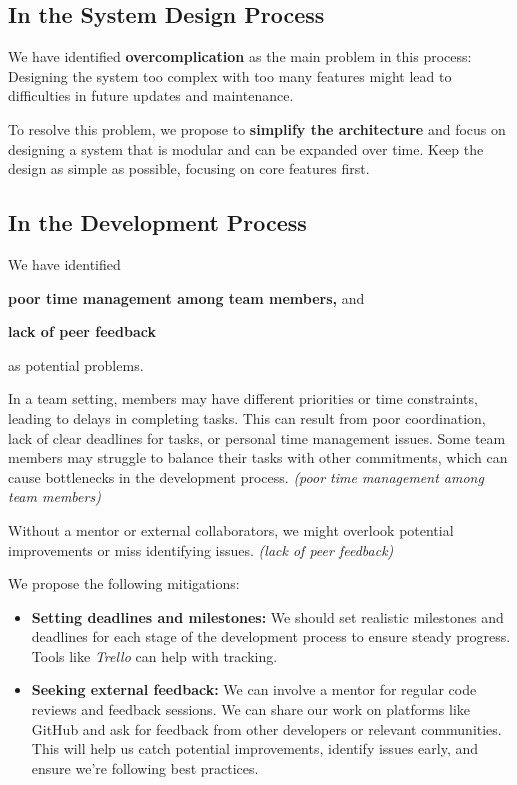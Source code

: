 \documentclass[a4paper,journal]{IEEEtran}
\begin{document}
\subsection{In the System Design Process}
We have identified \textbf{overcomplication} as the main problem in this
process:
Designing the system too complex with too many features might lead to
difficulties in future updates and maintenance.

To resolve this problem, we propose to \textbf{simplify the architecture} and
focus on designing a system that is modular and can be expanded over time.
Keep the design as simple as possible, focusing on core features first.

\subsection{In the Development Process}
We have identified
\begin{enumerate*}
  \item \textbf{poor time management among team members,} and
  \item \textbf{lack of peer feedback}
\end{enumerate*}
as potential problems.

In a team setting, members may have different priorities or time constraints,
leading to delays in completing tasks.
This can result from poor coordination, lack of clear deadlines for tasks, or
personal time management issues.
Some team members may struggle to balance their tasks with other commitments,
which can cause bottlenecks in the development process.
\textit{(poor time management among team members)}

Without a mentor or external collaborators, we might overlook potential
improvements or miss identifying issues.
\textit{(lack of peer feedback)}

We propose the following mitigations:
\begin{itemize}
  \item \textbf{Setting deadlines and milestones:}
    We should set realistic milestones and deadlines for each stage of the
    development process to ensure steady progress.
    Tools like \textit{Trello} can help with tracking.
  \item \textbf{Seeking external feedback:}
    We can involve a mentor for regular code reviews and feedback sessions.
    We can share our work on platforms like GitHub and ask for feedback from
    other developers or relevant communities.
    This will help us catch potential improvements, identify issues early, and
    ensure we're following best practices.
\end{itemize}
\end{document}
